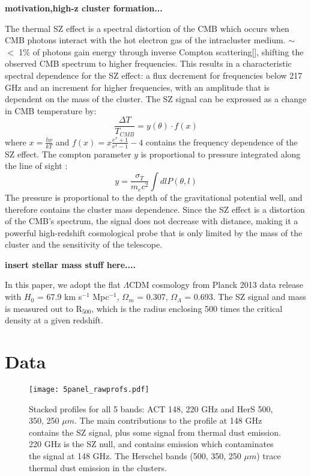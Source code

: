 \documentclass[twocolumn,iop]{emulateapj}
\begin{document}
\textbf{motivation,high-z cluster formation...}

The thermal SZ effect is a spectral distortion of the CMB which occurs when CMB photons interact with the hot electron gas of the intracluster medium. $\sim$ $<$ 1\% of photons gain energy through inverse Compton scattering[], shifting the observed CMB spectrum to higher frequencies. This results in a characteristic spectral dependence for the SZ effect: a flux decrement for frequencies below 217 GHz and an increment for higher frequencies, with an amplitude that is dependent on the mass of the cluster. \citep{1999PhR...310...97B,2002ARA&A..40..643C}
The SZ signal can be expressed as a change in CMB temperature by: \begin{equation}
\frac{\Delta T}{T_{CMB}} = y( \theta ) \cdot f( x )
\end{equation}
where $x = \frac{h \nu}{k T}$ and $f(x) = x \frac{e^{x} + 1}{e^{x}-1} - 4$ contains the frequency dependence of the SZ effect. The compton parameter $y$ is proportional to pressure integrated along the line of sight \citep{1972CoASP...4..173S,1970CoASP...2...66S}: 
\begin{equation}
y = \frac{\sigma_{T}}{m_{e} c^{2}} \int dl P(\theta, l) \end{equation} 
The pressure is proportional to the depth of the gravitational potential well, and therefore contains the cluster mass dependence.
Since the SZ effect is a distortion of the CMB's spectrum, the signal does not decrease with distance, making it a powerful high-redshift cosmological probe that is only limited by the mass of the cluster and the sensitivity of the telescope.

\textbf{insert stellar mass stuff here....}

In this paper, we adopt the flat $\Lambda$CDM cosmology from Planck 2013 data release \citep{2014A&A...571A..16P} with $H_{0}$ = 67.9 km s$^{-1}$ Mpc$^{-1}$, $\Omega_{m}$ = 0.307, $\Omega_{\Lambda}$ = 0.693. The SZ signal and mass is measured out to R$_{500}$, which is the radius enclosing 500 times the critical density at a given redshift.  

\section{Data}

\begin{figure}[!ht]
\centering
\texttt{[image: 5panel\_rawprofs.pdf]}
\caption{Stacked profiles for all 5 bands: ACT 148, 220 GHz and HerS 500, 350, 250 $\mu m$. The main contributions to the profile at 148 GHz contains the SZ signal, plus some signal from thermal dust emission. 220 GHz is the SZ null, and contains emission which contaminates the signal at 148 GHz. The Herschel bands (500, 350, 250 $\mu m$) trace thermal dust emission in the clusters.}
\label{fig:rawstacks}
\end{figure}
\end{document}
